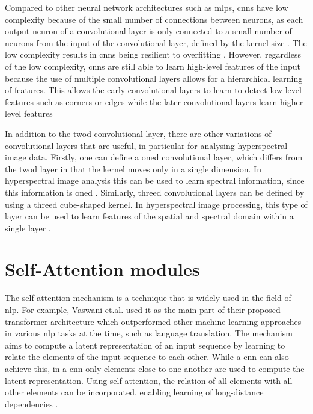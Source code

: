 Compared to other neural network architectures such as \acp{mlp}, \acp{cnn} have low complexity because of the small number of connections between neurons, as each output neuron of a convolutional layer is only connected to a small number of neurons from the input of the convolutional layer, defined by the kernel size \citep{gu_recent_2018}. The low complexity results in \acp{cnn} being resilient to overfitting \citep{oshea_introduction_2015,gu_recent_2018}. However, regardless of the low complexity, \acp{cnn} are still able to learn high-level features of the input because the use of multiple convolutional layers allows for a hierarchical learning of features. This allows the early convolutional layers to learn to detect low-level features such as corners or edges while the later convolutional layers learn higher-level features \citep{gu_recent_2018}

In addition to the \ac{twod} convolutional layer, there are other variations of convolutional layers that are useful, in particular for analysing hyperspectral image data. Firstly, one can define a \ac{oned} convolutional layer, which differs from the \ac{twod} layer in that the kernel moves only in a single dimension. In hyperspectral image analysis this can be used to learn spectral information, since this information is \ac{oned} \citep{kuester_1d-convolutional_2021,kuester_transferability_2022}. Similarly, \ac{threed} convolutional layers can be defined by using a \ac{threed} cube-shaped kernel. In hyperspectral image processing, this type of layer can be used to learn features of the spatial and spectral domain within a single layer \citep{guo_learned_2021}.

\section{Self-Attention modules}
The self-attention mechanism is a technique that is widely used in the field of \ac{nlp}. For example, Vaswani et.al. \citep{vaswani_attention_2017} used it as the main part of their proposed transformer architecture which outperformed other machine-learning approaches in various \ac{nlp} tasks at the time, such as language translation. The mechanism aims to compute a latent representation of an input sequence by learning to relate the elements of the input sequence to each other. While a \ac{cnn} can also achieve this, in a \ac{cnn} only elements close to one another are used to compute the latent representation. Using self-attention, the relation of all elements with all other elements can be incorporated, enabling learning of long-distance dependencies \citep{vaswani_attention_2017}.

